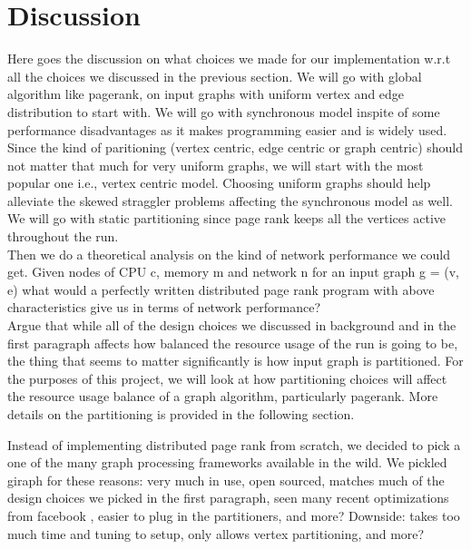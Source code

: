 \section{Discussion}
\label{sec:discussion}

Here goes the discussion on what choices we made for our implementation w.r.t 
all the choices we discussed in the previous section. We will go with global
algorithm like pagerank, on input graphs with uniform vertex and edge 
distribution to start with. We will go with synchronous model inspite of some
performance disadvantages as it makes programming easier and is widely used. 
Since the kind of paritioning (vertex centric, edge centric or graph centric) 
should not matter that much for very uniform graphs, we will start with the most 
popular one i.e., vertex centric model. Choosing uniform graphs should help 
alleviate the skewed straggler problems affecting the synchronous model as well.
We will go with static partitioning since page rank keeps all the vertices active
throughout the run. \\

Then we do a theoretical analysis on the kind of network performance we could 
get. Given nodes of CPU c, memory m and network n for an input graph g = (v, e)
what would a perfectly written distributed page rank program with above 
characteristics give us in terms of network performance? \\


Argue that while all of the design choices we discussed in background and in the 
first paragraph affects how balanced the resource usage of the run is going to be,
the thing that seems to matter significantly is how input graph is partitioned. For 
the purposes of this project, we will look at how partitioning choices will affect
the resource usage balance of a graph algorithm, particularly pagerank. More details
on the partitioning is provided in the following section.


Instead of implementing distributed page rank from scratch, we decided to pick a one 
of the many graph processing frameworks available in the wild. We pickled giraph
\cite{ApacheGiraph}
for these reasons: very much in use, open sourced, matches much of the design choices we 
picked in the first paragraph, seen many recent optimizations from facebook
\cite{GiraphAtFacebook}, easier to plug in the partitioners, and more?
Downside: takes too much time and tuning to setup, only allows vertex partitioning, and more?



